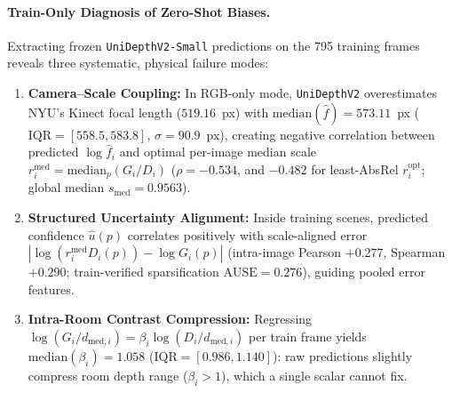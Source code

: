\documentclass[10pt,twocolumn,letterpaper]{article}
\begin{document}
\vspace{-0.2em}
\paragraph{Train-Only Diagnosis of Zero-Shot Biases.}
Extracting frozen \texttt{UniDepthV2-Small} predictions on the 795 training frames reveals three systematic, physical failure modes:
\begin{enumerate}
  \item \textbf{Camera--Scale Coupling:} In RGB-only mode, \texttt{UniDepthV2} overestimates NYU's Kinect focal length ($519.16$~px) with $\mathrm{median}(\hat{f})=573.11$~px ($\mathrm{IQR}=[558.5,583.8]$, $\sigma=90.9$~px), creating negative correlation between predicted $\log \hat{f}_i$ and optimal per-image median scale $r_i^{\text{med}} = \mathrm{median}_p(G_i/D_i)$ ($\rho = -0.534$, and $-0.482$ for least-AbsRel $r_i^{\text{opt}}$; global median $s_{\mathrm{med}}=0.9563$).
  \item \textbf{Structured Uncertainty Alignment:} Inside training scenes, predicted confidence $\hat{u}(p)$ correlates positively with scale-aligned error $|\log(r_i^{\text{med}} D_i(p)) - \log G_i(p)|$ (intra-image Pearson $+0.277$, Spearman $+0.290$; train-verified sparsification $\mathrm{AUSE}=0.276$), guiding pooled error features.
  \item \textbf{Intra-Room Contrast Compression:} Regressing $\log(G_i/d_{\text{med},i}) = \beta_i \log(D_i/d_{\text{med},i})$ per train frame yields $\mathrm{median}(\beta_i) = 1.058$ ($\mathrm{IQR}=[0.986,1.140]$): raw predictions slightly compress room depth range ($\beta_i > 1$), which a single scalar cannot fix.
\end{enumerate}

\vspace{-0.2em}
\end{document}
